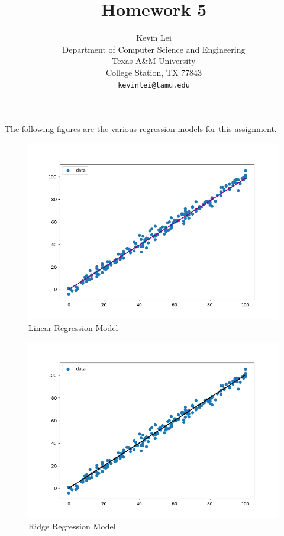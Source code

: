 \documentclass{article}
\title{Homework 5}
\author{
  Kevin Lei \\
  Department of Computer Science and Engineering \\
  Texas A\&M University \\
  College Station, TX 77843 \\
  \texttt{kevinlei@tamu.edu} \\
}
\begin{document}
\maketitle

The following figures are the various regression models for this assignment.

\begin{minipage}{0.5\textwidth}
  \begin{figure}[H]
    \centering
    \includegraphics[width=\textwidth]{linear.png}
    \caption{Linear Regression Model}
  \end{figure}
\end{minipage}
\begin{minipage}{0.5\textwidth}
  \begin{figure}[H]
    \centering
    \includegraphics[width=\textwidth]{ridge.png}
    \caption{Ridge Regression Model}
  \end{figure}
\end{minipage}
\end{document}
